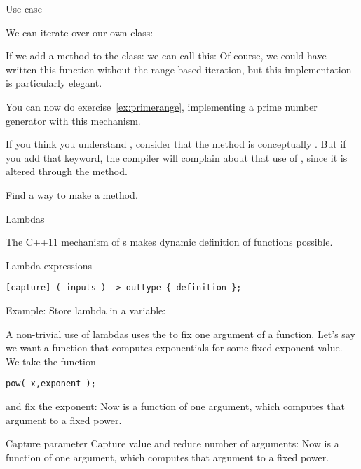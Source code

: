 \begin{block}{Use case}
  \label{sl:bagfind}

  We can iterate over our own class:
\end{block}

If we add a method  to the class:
%
%
we can call this:
%
%
Of course, we could have written this function
without the range-based iteration, but this implementation is
particularly elegant.

You can now do exercise~\ref{ex:primerange}, implementing a prime
number generator with this mechanism.

If you think you understand , consider that the 
method is conceptually . But if you add that keyword, the
compiler will complain about that use of , since it is
altered through the  method.

\begin{exercise}
  \label{ex:rangeconstiter}
  Find a way to make  a  method.
\end{exercise}

 {Lambdas}
\label{sec:lambda}

The C++11 mechanism of s makes
dynamic definition of functions possible.

\begin{block}{Lambda expressions}
  \label{sl:lambda-syntax}
\begin{verbatim}
[capture] ( inputs ) -> outtype { definition };
\end{verbatim}
Example:
Store lambda in a variable:
\end{block}

A non-trivial use of lambdas uses the  to fix one argument of a
function.
Let's say we want a function that computes exponentials for some fixed
exponent value. We take the 
 function
\begin{verbatim}
pow( x,exponent );
\end{verbatim}
and fix the exponent:
%
%
Now  is a function of one argument, which computes
that argument to a fixed power.

\begin{slide}{Capture parameter}
  \label{sl:lambda-capture}
  Capture value and reduce number of arguments:
  Now  is a function of one argument, which computes
  that argument to a fixed power.
\end{slide}

